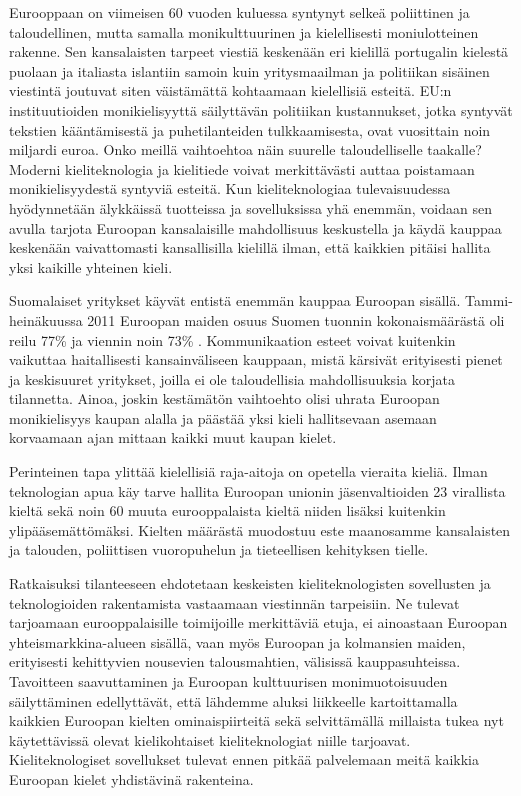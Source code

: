 \documentclass[]{../../metanetpaper}
\begin{document}
\begin{multicols}{2}

Eurooppaan on viimeisen 60 vuoden kuluessa syntynyt selkeä poliittinen
ja taloudellinen, mutta samalla monikulttuurinen ja kielellisesti
moniulotteinen rakenne. Sen kansalaisten tarpeet viestiä keskenään eri
kielillä portugalin kielestä puolaan ja italiasta islantiin samoin
kuin yritysmaailman ja politiikan sisäinen viestintä joutuvat siten
väistämättä kohtaamaan kielellisiä esteitä. EU:n instituutioiden
monikielisyyttä säilyttävän politiikan kustannukset, jotka syntyvät
tekstien kääntämisestä ja puhetilanteiden tulkkaamisesta, ovat
vuosittain noin miljardi euroa. Onko meillä vaihtoehtoa näin suurelle
taloudelliselle taakalle? Moderni kieliteknologia ja kielitiede voivat
merkittävästi auttaa poistamaan monikielisyydestä syntyviä
esteitä. Kun kieliteknologiaa tulevaisuudessa hyödynnetään älykkäissä
tuotteissa ja sovelluksissa yhä enemmän, voidaan sen avulla
tarjota Euroopan kansalaisille mahdollisuus keskustella ja käydä
kauppaa keskenään vaivattomasti kansallisilla kielillä ilman, että
kaikkien pitäisi hallita yksi kaikille yhteinen kieli.

Suomalaiset yritykset käyvät entistä enemmän kauppaa Euroopan sisällä.
Tammi-heinäkuussa 2011 Euroopan maiden osuus Suomen tuonnin
kokonaismäärästä oli reilu 77\% ja viennin noin 73\% \cite{SVT}.
Kommunikaation esteet voivat kuitenkin vaikuttaa haitallisesti
kansainväliseen kauppaan, mistä kärsivät erityisesti pienet ja
keskisuuret yritykset, joilla ei ole taloudellisia mahdollisuuksia
korjata tilannetta. Ainoa, joskin kestämätön vaihtoehto olisi uhrata
Euroopan monikielisyys kaupan alalla ja päästää yksi kieli
hallitsevaan asemaan korvaamaan ajan mittaan kaikki muut kaupan
kielet.

Perinteinen tapa ylittää kielellisiä raja-aitoja on opetella vieraita
kieliä. Ilman teknologian apua käy tarve hallita Euroopan unionin
jäsenvaltioiden 23 virallista kieltä sekä noin 60 muuta eurooppalaista
kieltä niiden lisäksi kuitenkin ylipääsemättömäksi. Kielten määrästä
muodostuu este maanosamme kansalaisten ja talouden, poliittisen
vuoropuhelun ja tieteellisen kehityksen tielle.

Ratkaisuksi tilanteeseen ehdotetaan keskeisten kieliteknologisten
sovellusten ja teknologioiden rakentamista vastaamaan viestinnän
tarpeisiin. Ne tulevat tarjoamaan eurooppalaisille toimijoille
merkittäviä etuja, ei ainoastaan Euroopan yhteismarkkina-alueen
sisällä, vaan myös Euroopan ja kolmansien maiden, erityisesti
kehittyvien nousevien talousmahtien, välisissä
kauppasuhteissa. Tavoitteen saavuttaminen ja Euroopan kulttuurisen
monimuotoisuuden säilyttäminen edellyttävät, että lähdemme aluksi
liikkeelle kartoittamalla kaikkien Euroopan kielten ominaispiirteitä
sekä selvittämällä millaista tukea nyt käytettävissä olevat
kielikohtaiset kieliteknologiat niille tarjoavat. Kieliteknologiset
sovellukset tulevat ennen pitkää palvelemaan meitä kaikkia Euroopan 
kielet yhdistävinä rakenteina.


\end{multicols}
\end{document}
